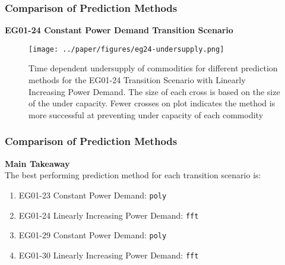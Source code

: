 \begin{frame}
    \frametitle{Comparison of Prediction Methods}
    \textbf{EG01-24 Constant Power Demand Transition Scenario}
\begin{figure}[htbp!]
    \begin{center}
      \texttt{[image: ../paper/figures/eg24-undersupply.png]}
    \end{center}
          \caption{Time dependent undersupply of commodities for different
          prediction methods for the EG01-24 Transition Scenario with Linearly Increasing Power Demand. The
          size of each cross is based on the size of the under capacity.
          Fewer crosses on plot indicates the method is more successful at preventing under capacity
          of each commodity}
  \end{figure}
\end{frame}

\begin{frame}
  \frametitle{Comparison of Prediction Methods}
  \textbf{Main Takeaway}
  \\
  The best performing prediction method for each transition scenario is: 
  \begin{enumerate}
    \item EG01-23 Constant Power Demand: \texttt{poly}
    \item EG01-24 Linearly Increasing Power Demand: \texttt{fft}
    \item EG01-29 Constant Power Demand: \texttt{poly}
    \item EG01-30 Linearly Increasing Power Demand: \texttt{fft}
\end{enumerate}
\end{frame}